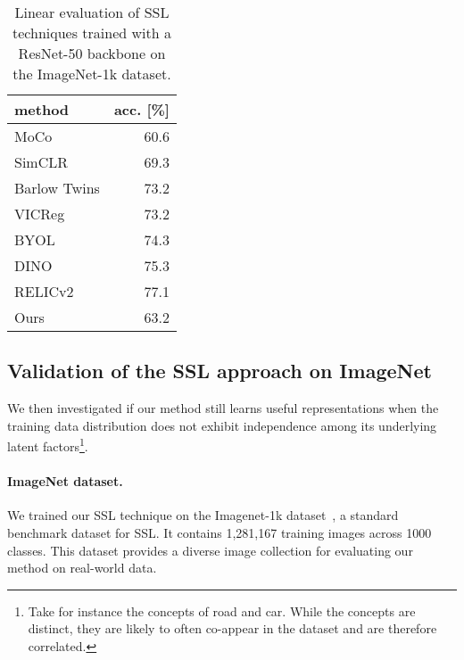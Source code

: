 \begin{table}[t]
            
    \small
    \centering
    \caption{Linear evaluation of SSL techniques trained with a ResNet-50 backbone on the ImageNet-1k dataset.}
    \label{tab:results_imagenet_ssl}
    \vskip 0.15in
    \begin{tabular}{lr}
    \toprule
        method  & acc. [\%] \\
    \midrule
        MoCo \citep{he2020MoCo_ssl}                 & 60.6  \\
        SimCLR \citep{chen2020SimCLR_ssl}           & 69.3  \\
        Barlow Twins \citep{zbontar2021barlow_ssl}  & 73.2  \\
        VICReg \citep{bardes2021vicreg_ssl}         & 73.2  \\
        BYOL \citep{grill2020BYOL_ssl}              & 74.3  \\
        DINO \citep{caron2021DINO_ssl}              & 75.3  \\
        RELICv2 \citep{tomasev2022pushing_ssl}      & 77.1 \\
        \rowcolor{lightgray}
        Ours                                        & 63.2 \\
    \bottomrule
    \end{tabular}
    \vskip -0.1in
\end{table}

\subsection{Validation of the SSL approach on ImageNet} \label{sec:results_imagenet}

We then investigated if our method still learns useful representations when the training data distribution does not exhibit independence among its underlying latent factors\footnote{Take for instance the concepts of road and car. While the concepts are distinct, they are likely to often co-appear in the dataset and are therefore correlated.}. %

\paragraph{ImageNet dataset.} We trained our SSL technique on the Imagenet-1k dataset~\citep{deng2009imagenet}, a standard benchmark dataset for SSL. It contains 1,281,167 training images across 1000 classes. This dataset provides a diverse image collection for evaluating our method on real-world data. 

